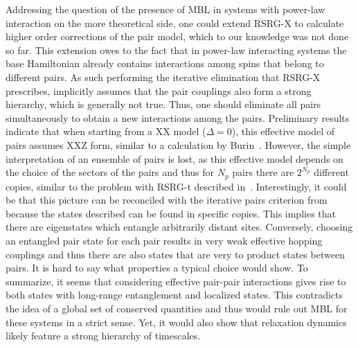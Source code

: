 Addressing the question of the presence of MBL in systems with power-law interaction on the more theoretical side, one could extend RSRG-X to calculate higher order corrections of the pair model, which to our knowledge was not done so far. This extension owes to the fact that in power-law interacting systems the base Hamiltonian already contains interactions among spins that belong to different pairs. As such performing the iterative elimination that RSRG-X prescribes, implicitly assumes that the pair couplings also form a strong hierarchy, which is generally not true. Thus, one should eliminate all pairs simultaneously to obtain a new interactions among the pairs. Preliminary results indicate that when starting from a XX model ($\Delta=0$), this effective model of pairs assumes XXZ form, similar to a calculation by Burin~\cite{burinLocalizationRandomXY2015}. However, the simple interpretation of an ensemble of pairs is lost, as this effective model depends on the choice of the sectors of the pairs and thus for $N_p$ pairs there are $2^{N_p}$ different copies, similar to the problem with RSRG-t described in~\cite{monthusStrongDisorderRenormalization2018}. Interestingly, it could be that this picture can be reconciled with the iterative pairs criterion from~\cite{yaoManyBodyLocalizationDipolar2014} because the states described can be found in specific copies. This implies that there are eigenstates which entangle arbitrarily distant sites. Conversely, choosing an entangled pair state for each pair results in very weak effective hopping couplings and thus there are also states that are very to product states between pairs. It is hard to say what properties a typical choice would show. To summarize, it seems that considering effective pair-pair interactions gives rise to both states with long-range entanglement and localized states. This contradicts the idea of a global set of conserved quantities and thus would rule out MBL for these systems in a strict sense. Yet, it would also show that relaxation dynamics likely feature a strong hierarchy of timescales.

